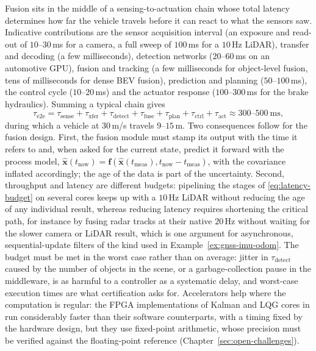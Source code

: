Fusion sits in the middle of a sensing-to-actuation chain whose total latency determines how far the vehicle travels before it can react to what the sensors saw. Indicative contributions are the sensor acquisition interval (an exposure and read-out of $10$--$30$\,ms for a camera, a full sweep of $100$\,ms for a $10$\,Hz LiDAR), transfer and decoding (a few milliseconds), detection networks ($20$--$60$\,ms on an automotive GPU), fusion and tracking (a few milliseconds for object-level fusion, tens of milliseconds for dense BEV fusion), prediction and planning ($50$--$100$\,ms), the control cycle ($10$--$20$\,ms) and the actuator response ($100$--$300$\,ms for the brake hydraulics). Summing a typical chain gives
\begin{equation}
\tau_{\mathrm{e2e}}=\tau_{\mathrm{sense}}+\tau_{\mathrm{xfer}}+\tau_{\mathrm{detect}}+\tau_{\mathrm{fuse}}+\tau_{\mathrm{plan}}+\tau_{\mathrm{ctrl}}+\tau_{\mathrm{act}}\approx 300\text{--}500\ \mathrm{ms},
\label{eq:latency-budget}
\end{equation}
during which a vehicle at $30$\,m/s travels $9$--$15$\,m. Two consequences follow for the fusion design. First, the fusion module must stamp its output with the time it refers to and, when asked for the current state, predict it forward with the process model, $\widehat{\mathbf{x}}(t_{\mathrm{now}})=\mathbf{f}(\widehat{\mathbf{x}}(t_{\mathrm{meas}}),t_{\mathrm{now}}-t_{\mathrm{meas}})$, with the covariance inflated accordingly; the age of the data is part of the uncertainty. Second, throughput and latency are different budgets: pipelining the stages of \eqref{eq:latency-budget} on several cores keeps up with a $10$\,Hz LiDAR without reducing the age of any individual result, whereas reducing latency requires shortening the critical path, for instance by fusing radar tracks at their native $20$\,Hz without waiting for the slower camera or LiDAR result, which is one argument for asynchronous, sequential-update filters of the kind used in Example~\ref{ex:gnss-imu-odom}. The budget must be met in the worst case rather than on average: jitter in $\tau_{\mathrm{detect}}$ caused by the number of objects in the scene, or a garbage-collection pause in the middleware, is as harmful to a controller as a systematic delay, and worst-case execution times are what certification asks for. Accelerators help where the computation is regular: the FPGA implementations of Kalman and LQG cores in \cite{deliparaschos2016_jee_fpga} run considerably faster than their software counterparts, with a timing fixed by the hardware design, but they use fixed-point arithmetic, whose precision must be verified against the floating-point reference (Chapter~\ref{sec:open-challenges}).

